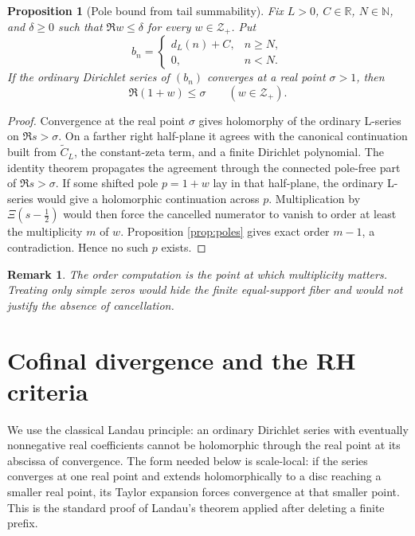 \documentclass[11pt]{article}
\newtheorem{proposition}[theorem]{Proposition}
\newtheorem{remark}[theorem]{Remark}
\newcommand{\R}{\mathbb R}
\newcommand{\N}{\mathbb N}
\newcommand{\XiR}{\Xi}
\newcommand{\cZ}{\mathcal Z}
\begin{document}
\begin{proposition}[Pole bound from tail summability]\label{prop:polebound}
Fix $L>0$, $C\in\R$, $N\in\N$, and $\delta\ge0$ such that
$\Re w\le\delta$ for every $w\in\cZ_+$.  Put
\[
 b_n=\begin{cases}d_L(n)+C,&n\ge N,\\0,&n<N.\end{cases}
\]
If the ordinary Dirichlet series of $(b_n)$ converges at a real point $\sigma>1$, then
\[
  \Re(1+w)\le\sigma\qquad(w\in\cZ_+).
  \tag{3.9}
\]
\end{proposition}

\begin{proof}
Convergence at the real point $\sigma$ gives holomorphy of the ordinary L-series on
$\Re s>\sigma$.  On a farther right half-plane it agrees with the canonical continuation built
from $\widetilde C_L$, the constant-zeta term, and a finite Dirichlet polynomial.  The identity
theorem propagates the agreement through the connected pole-free part of $\Re s>\sigma$.
If some shifted pole $p=1+w$ lay in that half-plane, the ordinary L-series would give a
holomorphic continuation across $p$.  Multiplication by $\XiR(s-\frac12)$ would then force the
cancelled numerator to vanish to order at least the multiplicity $m$ of $w$.  Proposition
\ref{prop:poles} gives exact order $m-1$, a contradiction.  Hence no such $p$ exists.
\end{proof}

\begin{remark}
The order computation is the point at which multiplicity matters.  Treating only simple zeros
would hide the finite equal-support fiber and would not justify the absence of cancellation.
\end{remark}

\section{Cofinal divergence and the RH criteria}

We use the classical Landau principle: an ordinary Dirichlet series with eventually nonnegative
real coefficients cannot be holomorphic through the real point at its abscissa of convergence.
The form needed below is scale-local: if the series converges at one real point and extends
holomorphically to a disc reaching a smaller real point, its Taylor expansion forces convergence
at that smaller point.  This is the standard proof of Landau's theorem applied after deleting a
finite prefix.
\end{document}
